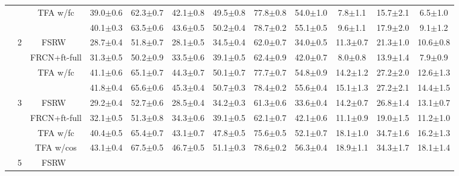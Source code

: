 \documentclass{article}
\newcommand{\model}{TFA\xspace}
\begin{document}
\begin{table*}[!h]
{\begin{tabular}{c|c|c|ccc|ccc|ccc}
    & & {\model w/fc} & 39.0$\pm$0.6 & 62.3$\pm$0.7 & 42.1$\pm$0.8 & 49.5$\pm$0.8 & 77.8$\pm$0.8 & 54.0$\pm$1.0 & 7.8$\pm$1.1 & 15.7$\pm$2.1 & 6.5$\pm$1.0 \\
    & & \cellcolor{Gray}{\model w/cos} & \cellcolor{Gray}40.1$\pm$0.3 &\cellcolor{Gray} 63.5$\pm$0.6 &\cellcolor{Gray} 43.6$\pm$0.5 &\cellcolor{Gray} 50.2$\pm$0.4 & \cellcolor{Gray}78.7$\pm$0.2 & \cellcolor{Gray}55.1$\pm$0.5 & \cellcolor{Gray}9.6$\pm$1.1 & \cellcolor{Gray}17.9$\pm$2.0 &\cellcolor{Gray} 9.1$\pm$1.2  \\ \cmidrule{2-12}
    & \multirow{4}{*}{2} & FSRW~\cite{kang2019few} & 28.7$\pm$0.4&51.8$\pm$0.7&28.1$\pm$0.5&34.5$\pm$0.4&62.0$\pm$0.7&34.0$\pm$0.5&11.3$\pm$0.7&21.3$\pm$1.0&10.6$\pm$0.8 \\
    & & FRCN+ft-full & 31.3$\pm$0.5 & 50.2$\pm$0.9 & 33.5$\pm$0.6 & 39.1$\pm$0.5 & 62.4$\pm$0.9 & 42.0$\pm$0.7 & 8.0$\pm$0.8 & 13.9$\pm$1.4 & 7.9$\pm$0.9 \\
    & &{\model w/fc} & 41.1$\pm$0.6 & 65.1$\pm$0.7 & 44.3$\pm$0.7 & 50.1$\pm$0.7 & 77.7$\pm$0.7 & 54.8$\pm$0.9 & 14.2$\pm$1.2 & 27.2$\pm$2.0 & 12.6$\pm$1.3  \\
    & & \cellcolor{Gray}{\model w/cos} & \cellcolor{Gray}41.8$\pm$0.4 &\cellcolor{Gray} 65.6$\pm$0.6 &\cellcolor{Gray} 45.3$\pm$0.4 & \cellcolor{Gray}50.7$\pm$0.3 & \cellcolor{Gray}78.4$\pm$0.2 & \cellcolor{Gray}55.6$\pm$0.4 & \cellcolor{Gray}15.1$\pm$1.3 &\cellcolor{Gray} 27.2$\pm$2.1 & \cellcolor{Gray}14.4$\pm$1.5  \\ \cmidrule{2-12}
    & \multirow{4}{*}{3} & FSRW~\cite{kang2019few} & 
    29.2$\pm$0.4&52.7$\pm$0.6&28.5$\pm$0.4&34.2$\pm$0.3&61.3$\pm$0.6&33.6$\pm$0.4&14.2$\pm$0.7&26.8$\pm$1.4&13.1$\pm$0.7 \\
    & & FRCN+ft-full & 32.1$\pm$0.5 & 51.3$\pm$0.8 & 34.3$\pm$0.6 & 39.1$\pm$0.5 & 62.1$\pm$0.7 & 42.1$\pm$0.6 & 11.1$\pm$0.9 & 19.0$\pm$1.5 & 11.2$\pm$1.0 \\
    & &{\model w/fc} & 40.4$\pm$0.5 & 65.4$\pm$0.7 & 43.1$\pm$0.7 & 47.8$\pm$0.5 & 75.6$\pm$0.5 & 52.1$\pm$0.7 & 18.1$\pm$1.0 & 34.7$\pm$1.6 & 16.2$\pm$1.3  \\
    & &\cellcolor{Gray} {\model w/cos} &\cellcolor{Gray} 43.1$\pm$0.4 & \cellcolor{Gray}67.5$\pm$0.5 & \cellcolor{Gray}46.7$\pm$0.5 & \cellcolor{Gray}51.1$\pm$0.3 &\cellcolor{Gray} 78.6$\pm$0.2 &\cellcolor{Gray} 56.3$\pm$0.4 & \cellcolor{Gray}18.9$\pm$1.1 &\cellcolor{Gray} 34.3$\pm$1.7 &\cellcolor{Gray} 18.1$\pm$1.4  \\ \cmidrule{2-12}
    & \multirow{4}{*}{5} & FSRW~\cite{kang2019few} & 

\end{tabular}}
\end{table*}
\end{document}
